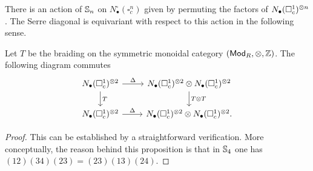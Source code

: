 

There is an action of $\S_n$ on $N^{\square}_\bullet(\square^n_c)$ given by permuting the factors of $\chains(\square^1_c)^{\otimes n}$.
The Serre diagonal is equivariant with respect to this action in the following sense.

\begin{proposition} \label{p:serre diagonal invariant}
	Let $T$ be the braiding on the symmetric monoidal category $(\Ch, \otimes, \Z)$. The following diagram commutes
	\begin{equation*}
	\begin{tikzcd}
	\chains(\square^1_c)^{\otimes 2} \arrow[r, "\Delta"] \arrow[d, "T"] &
	\chains(\square^1_c)^{\otimes 2} \otimes \chains(\square^1_c)^{\otimes 2} \arrow[d, "T \otimes T"] \\
	\chains(\square^1_c)^{\otimes 2} \arrow[r, "\Delta"] &
\chains(\square^1_c)^{\otimes 2} \otimes \chains(\square^1_c)^{\otimes 2}.
	\end{tikzcd}
	\end{equation*}
\end{proposition}

\begin{proof}
	This can be established by a straightforward verification. More conceptually, the reason behind this proposition is that in $\S_4$ one has $(12)(34)(23) = (23)(13)(24)$.
\end{proof}